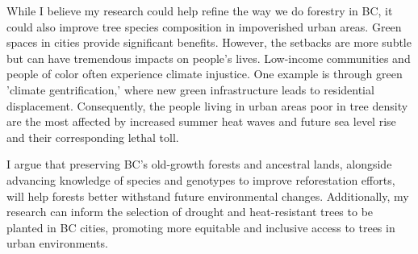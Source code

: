 \documentclass[11pt,letter]{article}
\begin{document}
While I believe my research could help refine the way we do forestry in BC, it could also improve tree species composition in impoverished urban areas. Green spaces in cities provide significant benefits. 
However, the setbacks are more subtle but can have tremendous impacts on people's lives. Low-income communities and people of color often experience climate injustice. One example is through green 'climate gentrification,' where new green infrastructure leads to residential displacement. \citep{anguelovski_why_2019} Consequently, the people living in urban areas poor in tree density are the most affected by increased summer heat waves and future sea level rise and their corresponding lethal toll. \citep{anguelovski_why_2019,triffo_green_2022} 

I argue that preserving BC's old-growth forests and ancestral lands, alongside advancing knowledge of species and genotypes to improve reforestation efforts, will help forests better withstand future environmental changes. Additionally, my research can inform the selection of drought and heat-resistant trees to be planted in BC cities, promoting more equitable and inclusive access to trees in urban environments.

\end{document}
